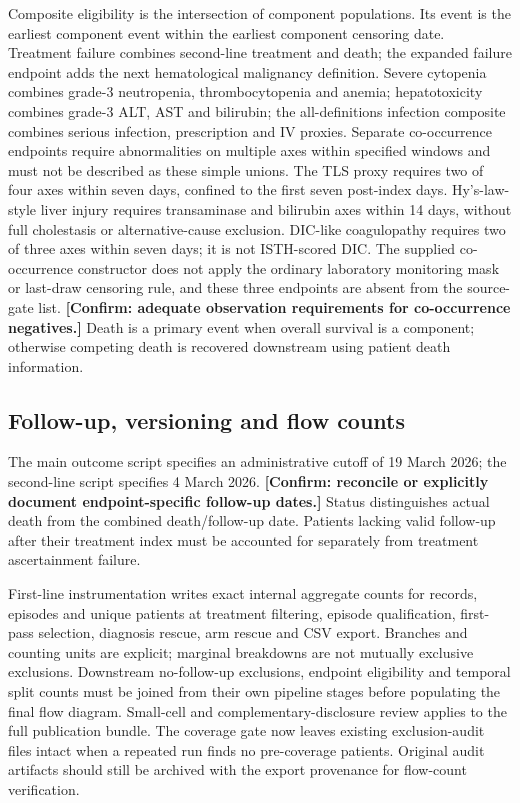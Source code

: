 \documentclass[10pt]{article}
\newcommand{\pending}[1]{\textbf{[Confirm: #1]}}
\begin{document}
Composite eligibility is the intersection of component populations. Its event
is the earliest component event within the earliest component censoring date.
Treatment failure combines second-line treatment and death; the expanded
failure endpoint adds the next hematological malignancy definition.
Severe cytopenia combines grade-3 neutropenia, thrombocytopenia and anemia;
hepatotoxicity combines grade-3 ALT, AST and bilirubin; the all-definitions
infection composite combines serious infection, prescription and IV proxies.
Separate co-occurrence endpoints require abnormalities on multiple axes
within specified windows and must not be described as these simple unions.
The TLS proxy requires two of four axes within seven days, confined to the first
seven post-index days. Hy's-law-style liver injury requires transaminase and
bilirubin axes within 14 days, without full cholestasis or alternative-cause
exclusion. DIC-like coagulopathy requires two of three axes within seven days;
it is not ISTH-scored DIC. The supplied co-occurrence constructor does not apply
the ordinary laboratory monitoring mask or last-draw censoring rule, and these
three endpoints are absent from the source-gate list.
\pending{adequate observation requirements for co-occurrence negatives.}
Death is a primary event when overall survival is a component; otherwise
competing death is recovered downstream using patient death information.

\subsection*{Follow-up, versioning and flow counts}
The main outcome script specifies an administrative cutoff of 19 March 2026;
the second-line script specifies 4 March 2026. \pending{reconcile or explicitly
document endpoint-specific follow-up dates.} Status distinguishes actual death
from the combined death/follow-up date. Patients lacking valid follow-up after
their treatment index must be accounted for separately from treatment
ascertainment failure.

First-line instrumentation writes exact internal aggregate counts for records,
episodes and unique patients at treatment filtering, episode qualification,
first-pass selection, diagnosis rescue, arm rescue and CSV export. Branches and
counting units are explicit; marginal breakdowns are not mutually exclusive
exclusions. Downstream no-follow-up exclusions, endpoint eligibility and temporal
split counts must be joined from their own pipeline stages before populating
the final flow diagram. Small-cell and complementary-disclosure review applies
to the full publication bundle.
The coverage gate now leaves existing exclusion-audit files intact when a
repeated run finds no pre-coverage patients. Original audit artifacts should
still be archived with the export provenance for flow-count verification.
\end{document}
